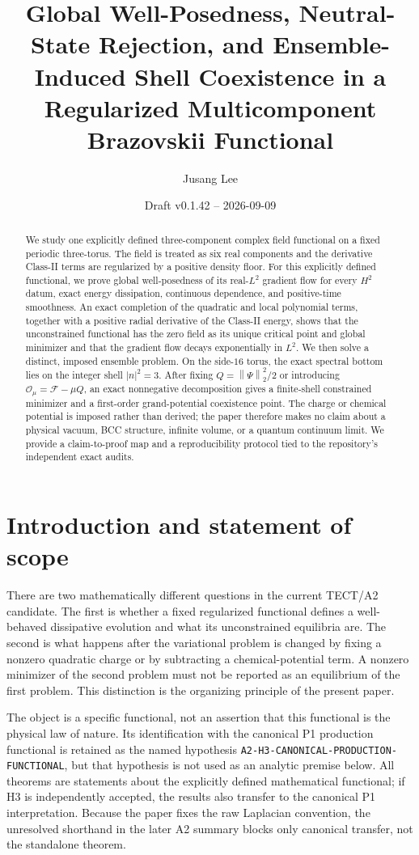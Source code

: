 \documentclass[11pt]{article}
\title{Global Well-Posedness, Neutral-State Rejection, and
       Ensemble-Induced Shell Coexistence in a Regularized
       Multicomponent Brazovskii Functional}
\author{Jusang Lee}
\date{Draft v0.1.42 -- 2026-09-09}
\numberwithin{equation}{section}
\theoremstyle{definition}
\newcommand{\cF}{\mathcal F}
\newcommand{\cO}{\mathcal O}
\newcommand{\norm}[1]{\left\lVert#1\right\rVert}
\begin{document}
\maketitle

\begin{abstract}
We study one explicitly defined three-component complex field functional on a
fixed periodic three-torus.  The field is treated as six real components and
the derivative Class-II terms are regularized by a positive density floor.
For this explicitly defined functional, we prove global well-posedness of its
real-$L^2$ gradient flow for every $H^2$ datum, exact energy dissipation,
continuous dependence, and positive-time smoothness.  An exact completion of
the quadratic and local polynomial terms, together with a positive radial
derivative of the Class-II energy, shows that the unconstrained functional has
the zero field as its unique critical point and global minimizer and that the
gradient flow decays exponentially in $L^2$.  We then solve a distinct,
imposed ensemble problem.  On the side-$16$ torus, the exact spectral bottom
lies on the integer shell $|n|^2=3$.  After fixing
$Q=\norm{\Psi}_{2}^{2}/2$ or introducing
$\cO_\mu=\cF-\mu Q$, an exact nonnegative decomposition gives a finite-shell
constrained minimizer and a first-order grand-potential coexistence point.
The charge or chemical potential is imposed rather than derived; the paper
therefore makes no claim about a physical vacuum, BCC structure, infinite
volume, or a quantum continuum limit.  We provide a claim-to-proof map and a
reproducibility protocol tied to the repository's independent exact audits.
\end{abstract}

\section{Introduction and statement of scope}

There are two mathematically different questions in the current TECT/A2
candidate.  The first is whether a fixed regularized functional defines a
well-behaved dissipative evolution and what its unconstrained equilibria are.
The second is what happens after the variational problem is changed by fixing
a nonzero quadratic charge or by subtracting a chemical-potential term.  A
nonzero minimizer of the second problem must not be reported as an equilibrium
of the first problem.  This distinction is the organizing principle of the
present paper.

The object is a specific functional, not an assertion that this functional is
the physical law of nature.  Its identification with the canonical P1
production functional is retained as the named hypothesis
\texttt{A2-H3-CANONICAL-PRODUCTION-FUNCTIONAL}, but that hypothesis is not used
as an analytic premise below.  All theorems are statements about the explicitly
defined mathematical functional; if H3 is independently accepted, the results
also transfer to the canonical P1 interpretation.  Because the paper fixes the
raw Laplacian convention, the unresolved shorthand in the later A2 summary
blocks only canonical transfer, not the standalone theorem.
\end{document}
